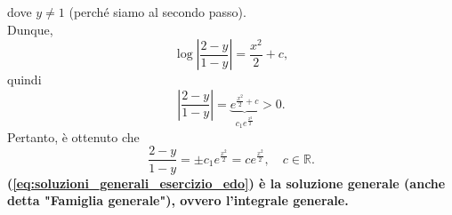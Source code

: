 \begin{example}
\begin{enumerate}
    dove $y\neq 1$ (perché siamo al secondo passo).\\
    Dunque,
    \begin{equation*}
        \log\left|\frac{2-y}{1-y}\right| = \frac{x^2}{2}+c,
    \end{equation*}
    quindi
    \begin{equation*}
        \left|\frac{2-y}{1-y}\right| = \underbrace{e^{\frac{x^2}{2}+ c}}_{c_1e^{\frac{x^2}{2}}}>0.
    \end{equation*}
    Pertanto, è ottenuto che 
    \begin{equation}\label{eq:soluzioni_generali_esercizio_edo}
        \frac{2-y}{1-y}=\pm c_1 e^{\frac{x^2}{2}}=c e^{\frac{x^2}{2}},\quad c\in\mathbb R.
    \end{equation}
    \textbf{(\ref{eq:soluzioni_generali_esercizio_edo}) è la soluzione generale (anche detta "Famiglia generale"), ovvero l'integrale generale.}

\end{enumerate}
\end{example}
